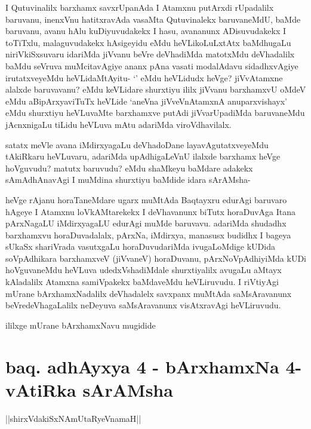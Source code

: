 \begin{artha}
I Qutuvinalilx barxhamx savxrUpanAda I Atamxnu putArxdi rUpadalilx baruvanu, inenxVnu hatitxravAda vasaMta Qutuvinalekx baruvaneMdU, baMde baruvanu, avanu hAlu kuDiyuvudakekx I hasu, avananunx ADisuvudakekx I toTiTxlu, malaguvudakekx hAsigeyidu eMdu heVLikoLuLxtAtx baMdhugaLu niriVkiSxsuvaru idariMda jiVvanu beVre deVhadiMda matotxMdu deVhadalilx baMdu seVruva muMcitavAgiye ananx pAna vasati modalAdavu sidadhxvAgiye irutatxveyeMdu heVLidaMtAyitu- `\stext ' eMdu heVLidudx heVge? jiVvAtamxne alalxde baruvavanu? eMdu keVLidare shurxtiyu ililx jiVvanu barxhamxvU oMdeV eMdu aBipArxyaviTuTx heVLide `aneVna jiVveVnAtamxnA anuparxvishayx' eMdu shurxtiyu heVLuvaMte barxhamxve putAdi jiVvarUpadiMda baruvaneMdu jAcnxnigaLu tiLidu heVLuva mAtu adariMda viroVdhavilalx. 	
\end{artha}%

\begin{artha}
satatx meVle avana iMdirxyagaLu deVhadoDane layavAgutatxveyeMdu tAkiRkaru heVLuvaru, adariMda upAdhigaLeVnU ilalxde barxhamx heVge hoVguvudu? matutx baruvudu? eMdu shaMkeyu baMdare adakekx sAmAdhAnavAgi I muMdina shurxtiyu baMdide \stext idara sArAMsha-
\end{artha}

\begin{artha}
heVge rAjanu horaTaneMdare ugarx muMtAda Baqtayxru edurAgi baruvaro hAgeye I Atamxnu loVkAMtarekekx I deVhavanunx biTutx horaDuvAga Itana pArxNagaLU iMdirxyagaLU edurAgi muMde baruvavu. adariMda shudadhx barxhamxvu horaDuvadalalx, pArxNa, iMdirxya, manasusx budidhx I bageya sUkaSx shariVrada vasutxgaLu horaDuvudariMda ivugaLoMdige kUDida soVpAdhikara barxhamxveV (jiVvaneV) horaDuvanu, pArxNoVpAdhiyiMda kUDi hoVguvaneMdu heVLuva udedxVshadiMdale shurxtiyalilx avugaLu aMtayx kAladalilx Atamxna samiVpakekx baMdaveMdu heVLiruvudu. I riVtiyAgi mUrane bArxhamxNadalilx deVhadalelx savxpanx muMtAda saMsAravanunx beVredeVhagaLalilx neDeyuva saMsAravanunx visAtxravAgi heVLiruvudu.
\end{artha}

\begin{center}
ililxge mUrane bArxhamxNavu mugidide
\end{center}

\section*{baq. adhAyxya 4 - bArxhamxNa 4-vAtiRka sArAMsha}

\begin{center}
||shirxVdakiSxNAmUtaRyeVnamaH||
\end{center}

